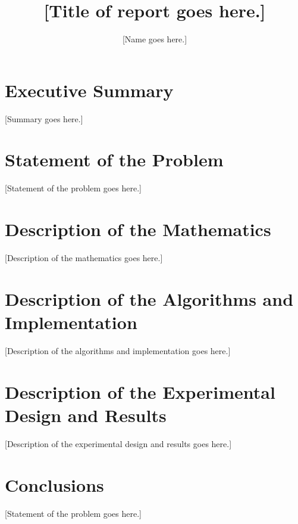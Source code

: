 \documentclass[11pt]{article}
\author{[Name goes here.]}
\title{[Title of report goes here.]}
\begin{document}
\maketitle

\section{Executive Summary}

[Summary goes here.]

\section{Statement of the Problem}

[Statement of the problem goes here.]

\section{Description of the Mathematics}

[Description of the mathematics goes here.]

\section{Description of the Algorithms and Implementation}

[Description of the algorithms and implementation goes here.]

\section{Description of the Experimental Design and Results}

[Description of the experimental design and results goes here.]

\section{Conclusions}

[Statement of the problem goes here.]
\end{document}
